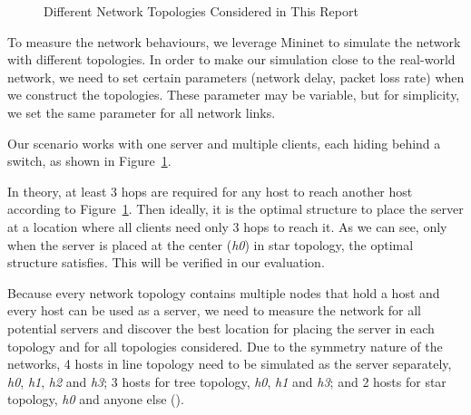 \begin{figure}[ht]

\caption{Different Network Topologies Considered in This Report} 
\label{fig:topo}
\end{figure}

To measure the network behaviours, we leverage Mininet \cite{Mininet:official}
to simulate the network with different topologies. In order to make our simulation
close to the real-world network, we need to set certain parameters (\eg network 
delay, packet loss rate) when we construct the topologies. These parameter may be
variable, but for simplicity, we set the same parameter for all network links. 

Our scenario works with one server and multiple clients, each hiding behind a 
switch, as shown in Figure~\ref{fig:topo}.

In theory, at least 3 hops are required for any host to reach another host according
to Figure~\ref{fig:topo}. Then ideally, it is the optimal structure to place the server 
at a location where all clients need only 3 hops to reach it. As we can see, only 
when the server is placed at the center ({\it h0}) in star topology, the optimal 
structure satisfies. This will be verified in our evaluation.

Because every network topology contains multiple nodes that hold a host and every 
host can be used as a server, we need to measure the network for all potential servers
and discover the best location for placing the server in each topology and for all
topologies considered. Due to the symmetry nature of the networks, 4 hosts in line topology
need to be simulated as the server separately, {\it h0}, {\it h1}, {\it h2} and 
{\it h3}; 3 hosts for tree topology, {\it h0}, {\it h1} and {\it h3}; and 
2 hosts for star topology, {\it h0} and anyone else (). 

